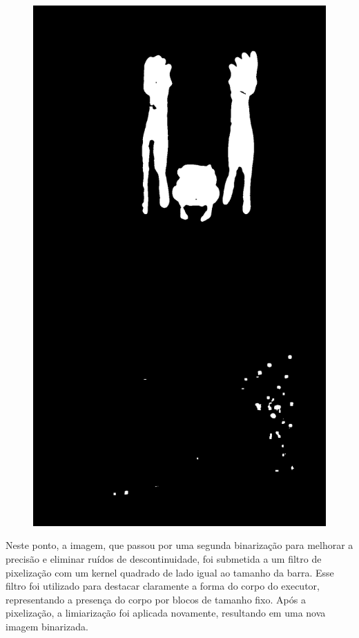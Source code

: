 \begin{figure}[H]
\begin{minipage}{\sizeImg\textwidth}
            \includegraphics[width=\textwidth]{figuras/mao_barra/limited2.png}
        \end{minipage}
    \label{fig:blur}
\end{figure}


Neste ponto, a imagem, que passou por uma segunda binarização para melhorar a precisão e eliminar ruídos de descontinuidade, foi submetida a um filtro de pixelização com um kernel quadrado de lado igual ao tamanho da barra. Esse filtro foi utilizado para destacar claramente a forma do corpo do executor, representando a presença do corpo por blocos de tamanho fixo. Após a pixelização, a limiarização foi aplicada novamente, resultando em uma nova imagem binarizada.

